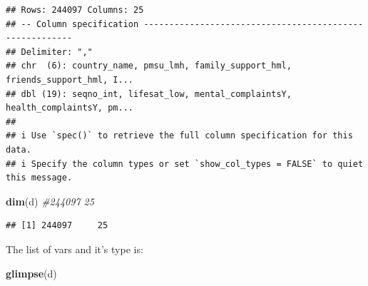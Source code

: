 \documentclass[
]{article}
\newenvironment{Shaded}{\begin{snugshade}}{\end{snugshade}}
\newcommand{\CommentTok}[1]{\textcolor[rgb]{0.56,0.35,0.01}{\textit{#1}}}
\newcommand{\FunctionTok}[1]{\textcolor[rgb]{0.13,0.29,0.53}{\textbf{#1}}}
\newcommand{\NormalTok}[1]{#1}
\begin{document}
\begin{verbatim}
## Rows: 244097 Columns: 25
## -- Column specification --------------------------------------------------------
## Delimiter: ","
## chr  (6): country_name, pmsu_lmh, family_support_hml, friends_support_hml, I...
## dbl (19): seqno_int, lifesat_low, mental_complaintsY, health_complaintsY, pm...
## 
## i Use `spec()` to retrieve the full column specification for this data.
## i Specify the column types or set `show_col_types = FALSE` to quiet this message.
\end{verbatim}

\begin{Shaded}
\begin{Highlighting}[]
\FunctionTok{dim}\NormalTok{(d) }\CommentTok{\#244097     25}
\end{Highlighting}
\end{Shaded}

\begin{verbatim}
## [1] 244097     25
\end{verbatim}

The list of vars and it's type is:

\begin{Shaded}
\begin{Highlighting}[]
\FunctionTok{glimpse}\NormalTok{(d)}
\end{Highlighting}
\end{Shaded}
\end{document}
